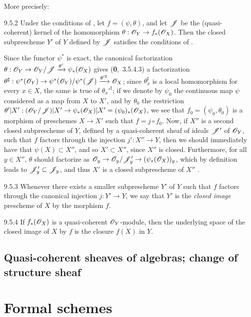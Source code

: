 More precisely:
\begin{envs}[Corollary]{9.5.2}
\label{cor-1.9.5.2}
Under the conditions of , let $f=(\psi,\theta)$, and let $\mathscr{J}$ be the
(quasi-coherent) kernel of the homomorphism $\theta:\mathscr{O}_Y\to f_*(\mathscr{O}_X)$. Then the closed
subprescheme $Y'$ of $Y$ defined by $\mathscr{J}$ satisfies the conditions of .
\end{envs}

Since the functor $\psi^*$ is exact, the canonical factorization
$\theta:\mathscr{O}_Y\to\mathscr{O}_Y/\mathscr{J}\xrightarrow{\theta'}\psi_*(\mathscr{O}_X)$ gives (\textbf{0},~3.5.4.3)
a factorization
$\theta^\sharp:\psi^*(\mathscr{O}_Y)\to\psi^*(\mathscr{O}_Y)/\psi^*(\mathscr{J})
\xrightarrow{{\theta'}^\sharp}\mathscr{O}_X$; since $\theta_x^\sharp$ is a local homomorphism for
every $x\in X$, the same is true of ${\theta_x'}^\sharp$; if we denote by $\psi_0$ the
continuous map $\psi$ considered as a map from $X$ to $X'$, and by $\theta_0$ the restriction
$\theta'|X':(\mathscr{O}_Y/\mathscr{J})|X'\to\psi_*(\mathscr{O}_X)|X'=(\psi_0)_*(\mathscr{O}_X)$, we see that
$f_0=(\psi_0,\theta_0)$ is a morphism of preschemes $X\to X'$  such that
$f=j\circ f_0$. Now, if $X''$ is
a second closed subprescheme of $Y$, defined by a quasi-coherent sheaf of ideals $\mathscr{J}'$ of
$\mathscr{O}_Y$, such that $f$ factors through the injection $j':X''\to Y$, then we should
immediately have that $\psi(X)\subset X''$, and so $X'\subset X''$, since $X''$ is closed.
Furthermore, for all $y\in X''$, $\theta$ should factorize as
$\mathscr{O}_y\to\mathscr{O}_y/\mathscr{J}'_y\to(\psi_*(\mathscr{O}_X))_y$, which by definition leads to
$\mathscr{J}'_y\subset\mathscr{J}_y$, and thus $X'$ is a closed subprescheme of $X''$
.

\begin{envs}[Definition]{9.5.3}
\label{defn-1.9.5.3}
Whenever there exists a smaller subprescheme $Y'$ of $Y$ such that $f$ factors through the
canonical injection $j:Y'\to Y$, we
say that $Y'$ is the \emph{closed image} prescheme of $X$ by the morphism $f$.
\end{envs}

\begin{envs}[Proposition]{9.5.4}
\label{prop-1.9.5.4}
If $f_*(\mathscr{O}_X)$ is a quasi-coherent $\mathscr{O}_Y$-module, then the underlying space of
the closed image of $X$ by $f$ is the closure $\overline{f(X)}$ in $Y$.
\end{envs}

\subsection{Quasi-coherent sheaves of algebras; change of structure sheaf}
\label{1-schemes-9.6}        

\section{Formal schemes}
\label{1-schemes-10}

